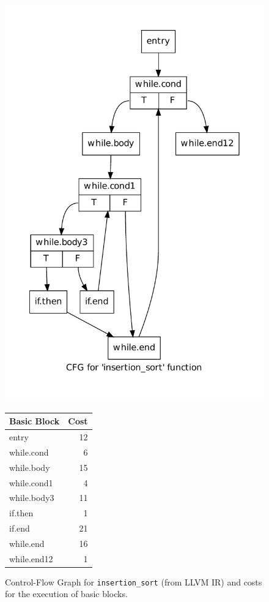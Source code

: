 \begin{figure}
  \centering
  \begin{minipage}[c]{.6\linewidth}
    \centering
    \includegraphics[width=0.90\linewidth]{../assignment/cfg_insertion_sort}
  \end{minipage}%
  \begin{minipage}[c]{.3\linewidth}
    \centering
    \small
    \begin{tabular}{|l|r|}
      \hline
      Basic Block & Cost \\
      \hline
      entry & 12 \\
      while.cond & 6 \\
      while.body & 15 \\
      while.cond1 & 4 \\
      while.body3 & 11 \\
      if.then & 1 \\
      if.end & 21 \\
      while.end & 16 \\
      while.end12 & 1 \\
      \hline
    \end{tabular}
  \end{minipage}
  \caption{Control-Flow Graph for \texttt{insertion\_sort} (from LLVM IR)
           and costs for the execution of basic blocks.}
  \label{fig:cfg.insertion_sort}
\end{figure}

\clearpage
